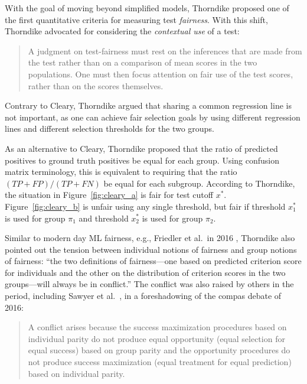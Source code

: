 \documentclass[sigconf,letterpaper,9pt]{acmart}
\begin{document}
With the goal of moving beyond simplified models, 
Thorndike \cite{thorndike1971concepts} proposed one of the first quantitative criteria for measuring test {\em fairness}.  With this shift, Thorndike advocated for considering the {\em contextual use} of a test: \vspace{-.15em}
\begin{quote}
\fontsize{8.5}{10}\selectfont
A judgment on test-fairness must rest on the inferences that are made from the test rather than on a comparison of mean scores in the two populations. One must then focus attention on fair use of the test scores, rather
than on the scores themselves.
\end{quote}

Contrary to Cleary, Thorndike argued that sharing a common regression line
is not important, as one can achieve fair selection goals by using different
regression lines and different selection thresholds for the two groups.

As an alternative to Cleary, Thorndike proposed that the ratio of predicted positives to ground truth positives be equal for each group. Using confusion matrix terminology, this is equivalent to requiring that the ratio
$(TP+FP)/(TP+FN)$ be equal for each subgroup. 
According to Thorndike, the situation in Figure~\ref{fig:cleary_a} is fair for 
test cutoff $x^*$. Figure~\ref{fig:cleary_b} is unfair using any single threshold, but fair if threshold $x_1^*$ is used for group $\pi_1$ and threshold
$x_2^*$ is used for group $\pi_2$. 

Similar to modern day ML fairness, e.g., Friedler et al.\ in 2016 \cite{friedler2016possibility}, Thorndike also pointed out the tension between individual notions of fairness and group notions of fairness: ``the two definitions of fairness---one based on predicted criterion score for individuals and the other on the distribution of criterion scores in the two groups---will always be in conflict.'' The conflict was also raised by others in the period, including 
Sawyer et al.\ \cite{sawyer1976utilities}, in a foreshadowing
of the {\sc compas} debate of 2016: 
\begin{quote}
\fontsize{8.5}{10}\selectfont
A conflict arises because the success maximization procedures based on individual
parity do not produce equal opportunity (equal selection for equal success) based on
group parity and the opportunity procedures do not produce success maximization
(equal treatment for equal prediction) based on individual parity.
\end{quote}
\end{document}

